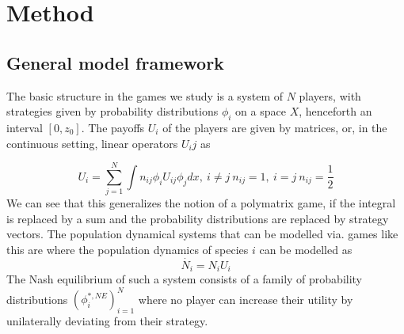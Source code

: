 \section{Method}
\subsection*{General model framework}


The basic structure in the games we study is a system of $N$ players, with strategies given by probability distributions $\phi_i$ on a space $X$, henceforth an interval $[0,z_0]$. The payoffs $U_i$ of the players are given by matrices, or, in the continuous setting, linear operators $U_ij$ as

\begin{equation}
  \label{eq:utility}
  U_i = \sum_{j=1}^N \int n_{ij}\phi_i U_{ij} \phi_j dx, ~i\neq j~n_{ij}=1,~i=j~n_{ij} = \frac{1}{2}
\end{equation}
We can see that this generalizes the notion of a polymatrix game, if the integral is replaced by a sum and the probability distributions are replaced by strategy vectors. The population dynamical systems that can be modelled via. games like this are where the population dynamics of species $i$ can be modelled as
\begin{equation}
  \dot{N_i} = N_i U_i
\end{equation}
The Nash equilibrium of such a system consists of a family of probability distributions $(\phi_i^{*,NE})_{i=1}^N$ where no player can increase their utility by unilaterally deviating from their strategy.

